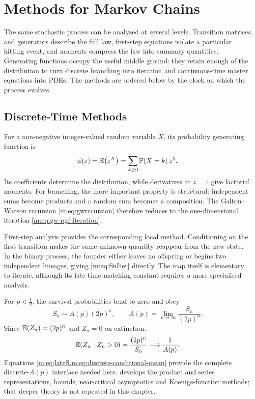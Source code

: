 \section{Methods for Markov Chains}\label{m:sec:methods}

The same stochastic process can be analysed at several levels.  Transition
matrices and generators describe the full law, first-step equations isolate a
particular hitting event, and moments compress the law into summary quantities.
Generating functions occupy the useful middle ground: they retain enough of the
distribution to turn discrete branching into iteration and continuous-time master
equations into PDEs.  The methods are ordered below by the clock on which the
process evolves.

\subsection{Discrete-Time Methods}\label{m:sec:discrete-methods}

For a non-negative integer-valued random variable $X$, its probability generating
function is
\begin{equation}
  \phi(z)=\mathbb{E}\!\left(z^X\right)=\sum_{k\geq0}\mathbb{P}\!\left(X=k\right)z^k.
  \label{m:eq:pgfdef}
\end{equation}
Its coefficients determine the distribution, while derivatives at $z=1$ give
factorial moments.  For branching, the more important property is structural:
independent sums become products and a random sum becomes a composition.  The
Galton--Watson recursion \cref{m:eq:gwrecursion} therefore reduces to the
one-dimensional iteration \cref{m:eq:gw-pgf-iteration}.

First-step analysis provides the corresponding local method.  Conditioning on the
first transition makes the same unknown quantity reappear from the new state.  In
the binary process, the founder either leaves no offspring or begins two
independent lineages, giving \cref{m:eq:SnIter} directly.  The map itself is
elementary to iterate, although its late-time matching constant requires a more
specialised analysis.

For $p<\tfrac12$, the survival probabilities tend to zero and obey
\begin{equation}
  S_n\sim A(p)(2p)^n,
  \qquad
  A(p)=\lim_{n\to\infty}\frac{S_n}{(2p)^n}.
  \label{m:eq:lateS}
\end{equation}
Since $\mathbb{E}\!\left(Z_n\right)=(2p)^n$ and $Z_n=0$ on extinction,
\begin{equation}
  \mathbb{E}\!\left(Z_n\mid Z_n>0\right)
  =\frac{(2p)^n}{S_n}
  \longrightarrow\frac{1}{A(p)}.
  \label{m:eq:discrete-conditional-mean}
\end{equation}
Equations \cref{m:eq:lateS,m:eq:discrete-conditional-mean} provide the complete
discrete-$A(p)$ interface needed here.  \ChA{} develops the product and series
representations, bounds, near-critical asymptotics and Koenigs-function methods;
that deeper theory is not repeated in this chapter.

